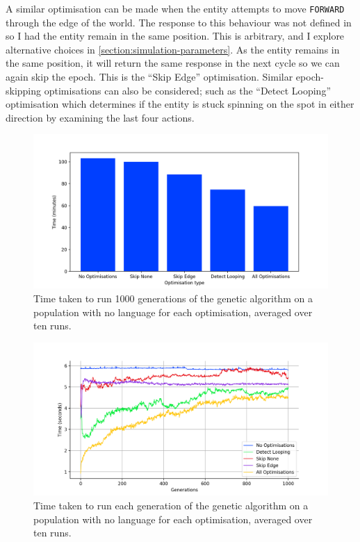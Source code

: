 \documentclass[12pt,a4paper]{report}
\begin{document}
A similar optimisation can be made when the entity attempts to move \texttt{FORWARD} through the edge of the world. The response to this behaviour was not defined in \citet{Cangelosi1998} so I had the entity remain in the same position. This is arbitrary, and I explore alternative choices in \cref{section:simulation-parameters}. As the entity remains in the same position, it will return the same response in the next cycle so we can again skip the epoch. This is the ``Skip Edge'' optimisation. Similar epoch-skipping optimisations can also be considered; such as the ``Detect Looping'' optimisation which determines if the entity is stuck spinning on the spot in either direction by examining the last four actions. 

\begin{figure}[t]
  \centering
  \includegraphics[width=.9\linewidth]{figs/speedup}
  \caption{Time taken to run 1000 generations of the genetic algorithm on a population with no language for each optimisation, averaged over ten runs.}
  \label{fig:speedup}
\end{figure}

\begin{figure}[t]
  \centering
  \includegraphics[width=.9\linewidth]{figs/generation-time}
  \caption{Time taken to run each generation of the genetic algorithm on a population with no language for each optimisation, averaged over ten runs.}
  \label{fig:generation-time}
\end{figure}
\end{document}
